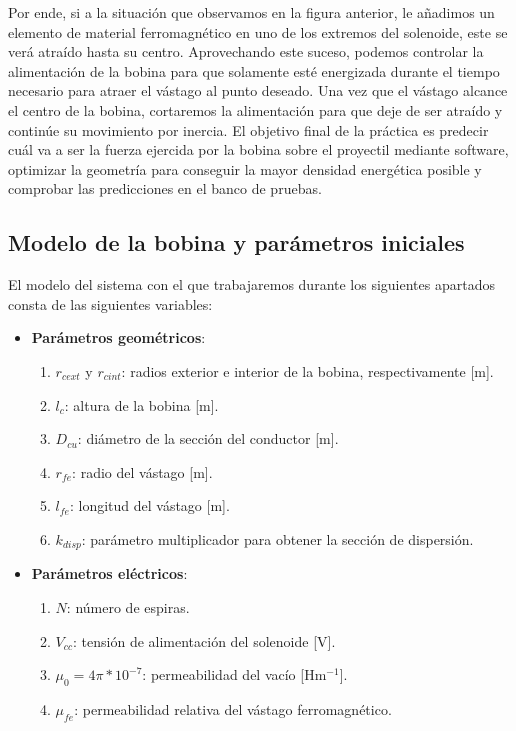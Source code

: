 Por ende, si a la situación que observamos en la figura anterior, le añadimos un elemento de material ferromagnético en uno de los extremos del solenoide, este se verá atraído hasta su centro. Aprovechando este suceso, podemos controlar la alimentación de la bobina para que solamente esté energizada durante el tiempo necesario para atraer el vástago al punto deseado. Una vez que el vástago alcance el centro de la bobina, cortaremos la alimentación para que deje de ser atraído y continúe su movimiento por inercia. El objetivo final de la práctica es predecir cuál va a ser la fuerza ejercida por la bobina sobre el proyectil mediante software, optimizar la geometría para conseguir la mayor densidad energética posible y comprobar las predicciones en el banco de pruebas.

\subsection*{Modelo de la bobina y parámetros iniciales}

El modelo del sistema con el que trabajaremos durante los siguientes apartados consta de las siguientes variables:

\begin{itemize}
    \item \textbf{Parámetros geométricos}:
    \begin{enumerate}[label=\alph*., leftmargin=*, itemindent=1em]
        \item \(r_{cext}\) y \(r_{cint} \): radios exterior e interior de la bobina, respectivamente [m].
        \item \(l_c\): altura de la bobina [m].
        \item \(D_{cu}\): diámetro de la sección del conductor [m].
        \item \(r_{fe}\): radio del vástago [m].
        \item \(l_{fe}\): longitud del vástago [m].
        \item \(k_{disp}\): parámetro multiplicador para obtener la sección de dispersión.
    \end{enumerate}
    \item \textbf{Parámetros eléctricos}:
    \begin{enumerate}[label=\alph*., leftmargin=*, itemindent=1em]
        \item \(N\): número de espiras.
        \item \(V_{cc}\): tensión de alimentación del solenoide [V].
        \item \(\mu_0 = 4\pi*10^{-7}\): permeabilidad del vacío [Hm\(^{-1}\)]. 
        \item \(\mu_{fe}\): permeabilidad relativa del vástago ferromagnético.
    \end{enumerate}
\end{itemize}

